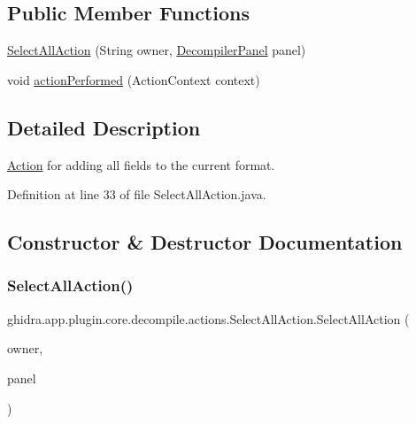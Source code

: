 \subsection*{Public Member Functions}
\begin{DoxyCompactItemize}
\item 
\mbox{\hyperlink{classghidra_1_1app_1_1plugin_1_1core_1_1decompile_1_1actions_1_1_select_all_action_ab3b1da2818bbeb7ad1b656e8e7f54ede}{Select\+All\+Action}} (String owner, \mbox{\hyperlink{classghidra_1_1app_1_1decompiler_1_1component_1_1_decompiler_panel}{Decompiler\+Panel}} panel)
\item 
void \mbox{\hyperlink{classghidra_1_1app_1_1plugin_1_1core_1_1decompile_1_1actions_1_1_select_all_action_a54661ec262394a94e38f7887c4968604}{action\+Performed}} (Action\+Context context)
\end{DoxyCompactItemize}


\subsection{Detailed Description}
\mbox{\hyperlink{class_action}{Action}} for adding all fields to the current format. 

Definition at line 33 of file Select\+All\+Action.\+java.



\subsection{Constructor \& Destructor Documentation}
\mbox{\label{classghidra_1_1app_1_1plugin_1_1core_1_1decompile_1_1actions_1_1_select_all_action_ab3b1da2818bbeb7ad1b656e8e7f54ede}} 
\subsubsection{\texorpdfstring{SelectAllAction()}{SelectAllAction()}}
{\footnotesize\ttfamily ghidra.\+app.\+plugin.\+core.\+decompile.\+actions.\+Select\+All\+Action.\+Select\+All\+Action (\begin{DoxyParamCaption}\item[{String}]{owner,  }\item[{\mbox{\hyperlink{classghidra_1_1app_1_1decompiler_1_1component_1_1_decompiler_panel}{Decompiler\+Panel}}}]{panel }\end{DoxyParamCaption})\hspace{0.3cm}{\ttfamily [inline]}}



